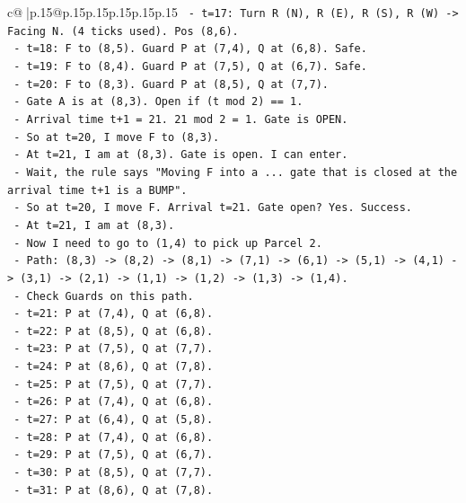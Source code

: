 \documentclass{article}
\begin{document}
{\begin{supertabular}{c@{$\;$}|p{.15\linewidth}@{}p{.15\linewidth}p{.15\linewidth}p{.15\linewidth}p{.15\linewidth}p{.15\linewidth}}
{{{\texttt{    {-} t=17: Turn R (N), R (E), R (S), R (W) {-}> Facing N. (4 ticks used). Pos (8,6).} \\
\texttt{    {-} t=18: F to (8,5). Guard P at (7,4), Q at (6,8). Safe.} \\
\texttt{    {-} t=19: F to (8,4). Guard P at (7,5), Q at (6,7). Safe.} \\
\texttt{    {-} t=20: F to (8,3). Guard P at (8,5), Q at (7,7).} \\
\texttt{      {-} Gate A is at (8,3). Open if (t mod 2) == 1.} \\
\texttt{      {-} Arrival time t+1 = 21. 21 mod 2 = 1. Gate is OPEN.} \\
\texttt{      {-} So at t=20, I move F to (8,3).} \\
\texttt{      {-} At t=21, I am at (8,3). Gate is open. I can enter.} \\
\texttt{      {-} Wait, the rule says "Moving F into a ... gate that is closed at the arrival time t+1 is a BUMP".} \\
\texttt{      {-} So at t=20, I move F. Arrival t=21. Gate open? Yes. Success.} \\
\texttt{      {-} At t=21, I am at (8,3).} \\
\texttt{      {-} Now I need to go to (1,4) to pick up Parcel 2.} \\
\texttt{      {-} Path: (8,3) {-}> (8,2) {-}> (8,1) {-}> (7,1) {-}> (6,1) {-}> (5,1) {-}> (4,1) {-}> (3,1) {-}> (2,1) {-}> (1,1) {-}> (1,2) {-}> (1,3) {-}> (1,4).} \\
\texttt{      {-} Check Guards on this path.} \\
\texttt{      {-} t=21: P at (7,4), Q at (6,8).} \\
\texttt{      {-} t=22: P at (8,5), Q at (6,8).} \\
\texttt{      {-} t=23: P at (7,5), Q at (7,7).} \\
\texttt{      {-} t=24: P at (8,6), Q at (7,8).} \\
\texttt{      {-} t=25: P at (7,5), Q at (7,7).} \\
\texttt{      {-} t=26: P at (7,4), Q at (6,8).} \\
\texttt{      {-} t=27: P at (6,4), Q at (5,8).} \\
\texttt{      {-} t=28: P at (7,4), Q at (6,8).} \\
\texttt{      {-} t=29: P at (7,5), Q at (6,7).} \\
\texttt{      {-} t=30: P at (8,5), Q at (7,7).} \\
\texttt{      {-} t=31: P at (8,6), Q at (7,8).} \\
}}}
\end{supertabular}}
\end{document}
